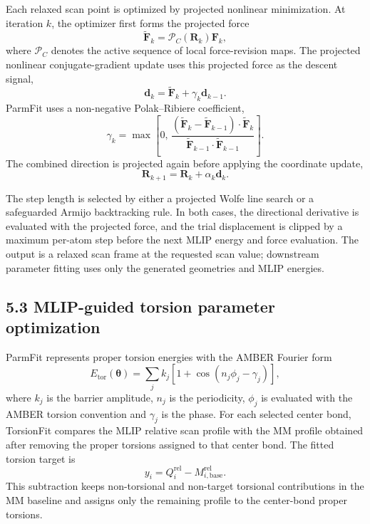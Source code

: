 Each relaxed scan point is optimized by projected nonlinear minimization. At iteration $k$, the optimizer first forms the projected force
\begin{equation}
\widetilde{\mathbf{F}}_k =
\mathcal{P}_C(\mathbf{R}_k)\mathbf{F}_k ,
\end{equation}
where $\mathcal{P}_C$ denotes the active sequence of local force-revision maps. The projected nonlinear conjugate-gradient update uses this projected force as the descent signal,
\begin{equation}
\mathbf{d}_k =
\widetilde{\mathbf{F}}_k+\gamma_k\mathbf{d}_{k-1}.
\end{equation}
ParmFit uses a non-negative Polak--Ribiere coefficient,
\begin{equation}
\gamma_k =
\max\left[
0,\,
\frac{
\left(\widetilde{\mathbf{F}}_k-\widetilde{\mathbf{F}}_{k-1}\right)\cdot \widetilde{\mathbf{F}}_k
}{
\widetilde{\mathbf{F}}_{k-1}\cdot\widetilde{\mathbf{F}}_{k-1}
}
\right].
\end{equation}
The combined direction is projected again before applying the coordinate update,
\begin{equation}
\mathbf{R}_{k+1}
=
\mathbf{R}_k+\alpha_k\mathbf{d}_k .
\end{equation}

The step length is selected by either a projected Wolfe line search or a safeguarded Armijo backtracking rule. In both cases, the directional derivative is evaluated with the projected force, and the trial displacement is clipped by a maximum per-atom step before the next MLIP energy and force evaluation. The output is a relaxed scan frame at the requested scan value; downstream parameter fitting uses only the generated geometries and MLIP energies.

\subsection{5.3 MLIP-guided torsion parameter optimization}

ParmFit represents proper torsion energies with the AMBER Fourier form
\begin{equation}
E_{\mathrm{tor}}(\boldsymbol{\theta}) =
\sum_j
k_j
\left[
1+\cos\left(n_j\phi_j-\gamma_j\right)
\right],
\end{equation}
where $k_j$ is the barrier amplitude, $n_j$ is the periodicity, $\phi_j$ is evaluated with the AMBER torsion convention and $\gamma_j$ is the phase. For each selected center bond, TorsionFit compares the MLIP relative scan profile with the MM profile obtained after removing the proper torsions assigned to that center bond. The fitted torsion target is
\begin{equation}
y_i =
Q_i^{\mathrm{rel}} -
M_{i,\mathrm{base}}^{\mathrm{rel}} .
\end{equation}
This subtraction keeps non-torsional and non-target torsional contributions in the MM baseline and assigns only the remaining profile to the center-bond proper torsions.

